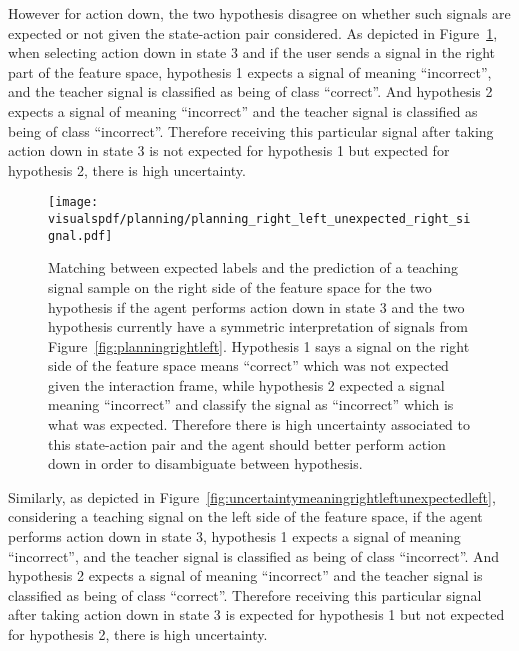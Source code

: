 However for action down, the two hypothesis disagree on whether such signals are expected or not given the state-action pair considered. As depicted in Figure~\ref{fig:uncertaintymeaningrightleftunexpectedright}, when selecting action down in state 3 and if the user sends a signal in the right part of the feature space, hypothesis 1 expects a signal of meaning ``incorrect'', and the teacher signal is classified as being of class ``correct''. And hypothesis 2 expects a signal of meaning ``incorrect'' and the teacher signal is classified as being of class ``incorrect''. Therefore receiving this particular signal after taking action down in state 3 is not expected for hypothesis 1 but expected for hypothesis 2, there is high uncertainty.

\begin{figure}[!ht]
  \centering
  \texttt{[image: \\visualspdf/planning/planning\_right\_left\_unexpected\_right\_signal.pdf]}
  \caption{Matching between expected labels and the prediction of a teaching signal sample on the right side of the feature space for the two hypothesis if the agent performs action down in state 3 and the two hypothesis currently have a symmetric interpretation of signals from Figure~\ref{fig:planningrightleft}. Hypothesis 1 says a signal on the right side of the feature space means ``correct'' which was not expected given the interaction frame, while hypothesis 2 expected a signal meaning ``incorrect'' and classify the signal as ``incorrect'' which is what was expected. Therefore there is high uncertainty associated to this state-action pair and the agent should better perform action down in order to disambiguate between hypothesis.}
  \label{fig:uncertaintymeaningrightleftunexpectedright}
\end{figure}

Similarly, as depicted in Figure~\ref{fig:uncertaintymeaningrightleftunexpectedleft}, considering a teaching signal on the left side of the feature space, if the agent performs action down in state 3, hypothesis 1 expects a signal of meaning ``incorrect'', and the teacher signal is classified as being of class ``incorrect''. And hypothesis 2 expects a signal of meaning ``incorrect'' and the teacher signal is classified as being of class ``correct''. Therefore receiving this particular signal after taking action down in state 3 is expected for hypothesis 1 but not expected for hypothesis 2, there is high uncertainty.

